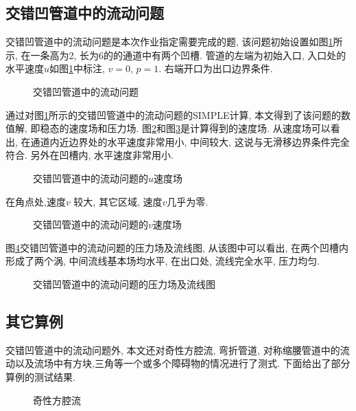 \documentclass[a4paper,boxed,11pt]{caspset}
\begin{document}
\subsection{交错凹管道中的流动问题}
交错凹管道中的流动问题是本次作业指定需要完成的题, 该问题初始设置如图\ref{case0}所示, 在一条高为2, 长为6的的通道中有两个凹槽. 管道的左端为初始入口, 入口处的水平速度$u$如图\ref{case0}中标注, $v=0$, $p=1$. 右端开口为出口边界条件.
\begin{figure}[!htb]
\centering

\caption{\label{case0}交错凹管道中的流动问题}
\end{figure}

\newpage
通过对图\ref{case0}所示的交错凹管道中的流动问题的SIMPLE计算, 本文得到了该问题的数值解, 即稳态的速度场和压力场. 图\ref{0u}和图\ref{0v}是计算得到的速度场. 从速度场可以看出, 在通道内近边界处的水平速度非常用小, 中间较大, 这说与无滑移边界条件完全符合. 另外在凹槽内, 水平速度非常用小.
\begin{figure}[!htb]
\centering

\caption{\label{0u}交错凹管道中的流动问题的$u$速度场}
\end{figure}
在角点处,速度$v$ 较大, 其它区域, 速度$v$几乎为零.
\begin{figure}[!htb]
\centering

\caption{\label{0v}交错凹管道中的流动问题的$v$速度场}
\end{figure}
图\ref{0p}交错凹管道中的流动问题的压力场及流线图, 从该图中可以看出, 在两个凹槽内形成了两个涡, 中间流线基本场均水平, 在出口处, 流线完全水平, 压力均匀.
\begin{figure}[!htb]
\centering

\caption{\label{0p}交错凹管道中的流动问题的压力场及流线图}
\end{figure}


\subsection{其它算例}
交错凹管道中的流动问题外, 本文还对奇性方腔流, 弯折管道, 对称缩腰管道中的流动以及流场中有方块,三角等一个或多个障碍物的情况进行了测式.  下面给出了部分算例的测试结果.
\begin{figure}[!htb]
\centering

\caption{奇性方腔流}
\end{figure}

\newpage
\end{document}
